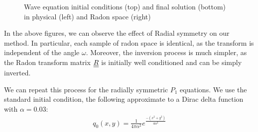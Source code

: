 \begin{figure}[H]
\begin{tabular}{cc}
    \end{tabular}
    \caption{Wave equation initial conditions (top) and final solution (bottom) \\ in physical (left) and Radon space (right)}
\end{figure}
\FloatBarrier
In the above figures, we can observe the effect of Radial symmetry on our method. In particular, each sample of radon space is identical, as the transform is independent of the angle $\omega$. Moreover, the inversion process is much simpler, as the Radon transform matrix ${\underline{\underline{R}}}$ is initially well conditioned and can be simply inverted.

\newpage
We can repeat this process for the radially symmetric $P_1$ equations. We use the standard initial condition, the following approximate to a Dirac delta function with $\alpha = 0.03$:
\begin{align*}
    q_0(x, y) = \frac{1}{4\pi\alpha^2}e^{\frac{ -(x^2 + y^2) }{4\alpha^2} }
\end{align*}
\FloatBarrier
